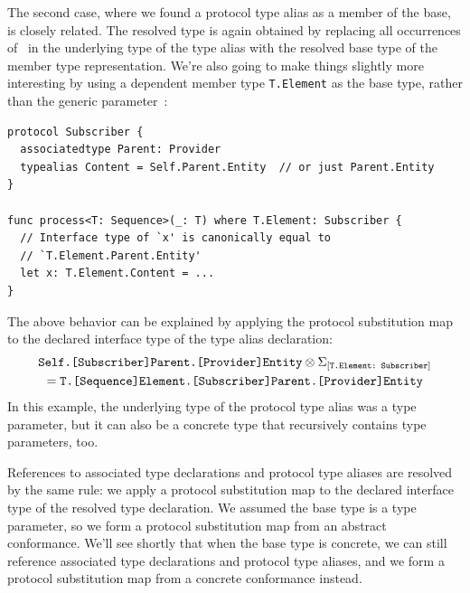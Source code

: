 \documentclass[../generics]{subfiles}
\begin{document}
The second case, where we found a protocol type alias as a member of the base, is closely related. The resolved type is again obtained by replacing all occurrences of \tSelf\ in the underlying type of the type alias with the resolved base type of the member type representation. We're also going to make things slightly more interesting by using a dependent member type \texttt{T.Element} as the base type, rather than the generic parameter~\tT:
\begin{Verbatim}
protocol Subscriber {
  associatedtype Parent: Provider
  typealias Content = Self.Parent.Entity  // or just Parent.Entity
}

func process<T: Sequence>(_: T) where T.Element: Subscriber {
  // Interface type of `x' is canonically equal to
  // `T.Element.Parent.Entity'
  let x: T.Element.Content = ...
}
\end{Verbatim}
The above behavior can be explained by applying the protocol substitution map to the declared interface type of the type alias declaration:
\begin{multline*}
\texttt{Self.[Subscriber]Parent.[Provider]Entity}\otimes\Sigma_{[\texttt{T.Element:~Subscriber}]}\\
=\texttt{T.[Sequence]Element.[Subscriber]Parent.[Provider]Entity}
\end{multline*}
In this example, the underlying type of the protocol type alias was a type parameter, but it can also be a concrete type that recursively contains type parameters, too.

\smallskip

References to associated type declarations and protocol type aliases are resolved by the same rule: we apply a protocol substitution map to the declared interface type of the resolved type declaration. We assumed the base type is a type parameter, so we form a protocol substitution map from an abstract conformance. We'll see shortly that when the base type is concrete, we can still reference associated type declarations and protocol type aliases, and we form a protocol substitution map from a concrete conformance instead.
\end{document}
